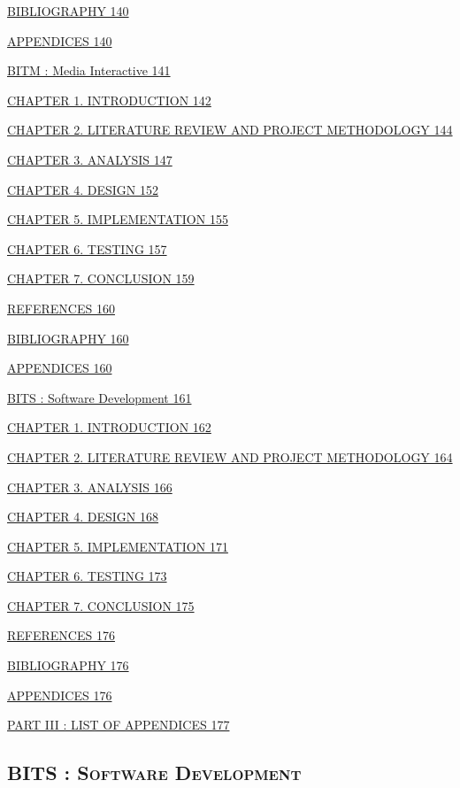 \documentclass[12pt,a4paper]{article}
\begin{document}
\hyperref[_bookmark70]{BIBLIOGRAPHY 140}

\hyperref[_bookmark71]{APPENDICES 140}

\hyperref[_bookmark72]{BITM : Media Interactive 141}

\hyperref[_bookmark73]{CHAPTER 1. INTRODUCTION 142}

\hyperref[_bookmark74]{CHAPTER 2. LITERATURE REVIEW AND PROJECT
METHODOLOGY 144}

\hyperref[_bookmark75]{CHAPTER 3. ANALYSIS 147}

\hyperref[_bookmark76]{CHAPTER 4. DESIGN 152}

\hyperref[_bookmark77]{CHAPTER 5. IMPLEMENTATION 155}

\hyperref[_bookmark78]{CHAPTER 6. TESTING 157}

\hyperref[_bookmark79]{CHAPTER 7. CONCLUSION 159}

\hyperref[_bookmark80]{REFERENCES 160}

\hyperref[_bookmark81]{BIBLIOGRAPHY 160}

\hyperref[_bookmark82]{APPENDICES 160}

\hyperref[bits-software-development]{BITS : Software Development 161}

\hyperref[chapter-1.-introduction]{CHAPTER 1. INTRODUCTION 162}

\hyperref[chapter-2.-literature-review-and-project-methodology]{CHAPTER
2. LITERATURE REVIEW AND PROJECT METHODOLOGY 164}

\hyperref[chapter-3.-analysis]{CHAPTER 3. ANALYSIS 166}

\hyperref[chapter-4.-design]{CHAPTER 4. DESIGN 168}

\hyperref[chapter-5.-implementation]{CHAPTER 5. IMPLEMENTATION 171}

\hyperref[chapter-6.-testing]{CHAPTER 6. TESTING 173}

\hyperref[chapter-7.-conclusion]{CHAPTER 7. CONCLUSION 175}

\hyperref[references]{REFERENCES 176}

\hyperref[bibliography]{BIBLIOGRAPHY 176}

\hyperref[appendices]{APPENDICES 176}

\hyperref[part-iii-list-of-appendices]{PART III : LIST OF APPENDICES
177}

\protect{}\label{_bookmark0}{}

\subsection{\texorpdfstring{\textsc{BITS : Software
Development}}{BITS : Software Development}}\label{bits-software-development}
\end{document}
